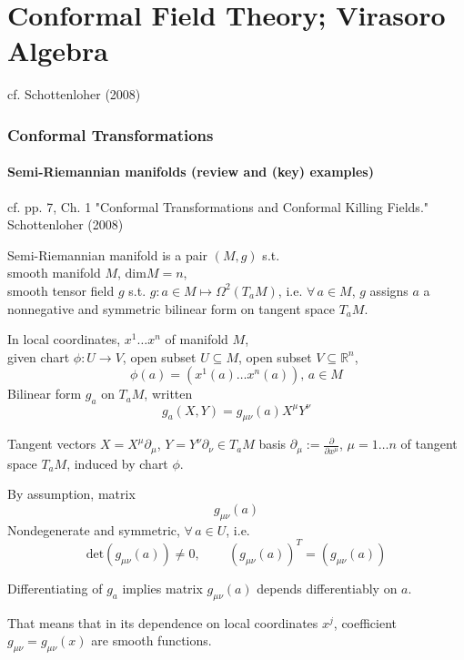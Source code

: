 \part{Conformal Field Theory; Virasoro Algebra}
  

cf. Schottenloher (2008)  \cite{agat:Scho2008}

\section{Conformal Transformations}

\subsection{Semi-Riemannian manifolds (review and (key) examples)}

cf. pp. 7, Ch. 1 "Conformal Transformations and Conformal Killing Fields." Schottenloher (2008)  \cite{agat:Scho2008}

Semi-Riemannian manifold is a pair $(M, g)$ s.t. \\
smooth manifold $M$, $\text{dim}{M} = n$, \\
smooth tensor field $g$ s.t. $g: a\in M \mapsto \Omega^2(T_aM)$, i.e. 
$\forall \, a \in M$, $g$ assigns $a$ a nonnegative and symmetric bilinear form on tangent space $T_aM$. 

In local coordinates, $x^1 \dots x^n $ of manifold $M$,  \\
given chart $\phi : U \to V$, open subset $U \subseteq M$, open subset $V \subseteq \mathbb{R}^n$, 
\[
\phi(a) = (x^1(a) \dots x^n(a)), \, a\in M
\]
Bilinear form $g_a$ on $T_aM$, written
\[
g_a(X,Y) = g_{\mu \nu}(a) X^{\mu} Y^{\nu}
\]

Tangent vectors $X = X^{\mu} \partial_{\mu}$, $Y = Y^{\nu} \partial_{\nu} \in T_aM$ basis $\partial_{\mu} := \frac{ \partial }{ \partial x^{\mu}}$, $\mu = 1 \dots n$ of tangent space $T_aM$, induced by chart $\phi$. 

By assumption, matrix
\[
g_{\mu \nu}(a)
\]
Nondegenerate and symmetric, $\forall \, a \in U$, i.e. 
\[
\text{det}(g_{\mu \nu }(a)) \neq 0 , \qquad \, (g_{\mu \nu}(a))^T = (g_{\mu \nu}(a))
\]

Differentiating of $g_a$ implies matrix $g_{\mu \nu}(a)$ depends differentiably on $a$.

That means that in its dependence on local coordinates $x^j$, coefficient $g_{\mu \nu} = g_{\mu \nu}(x)$ are smooth functions.

